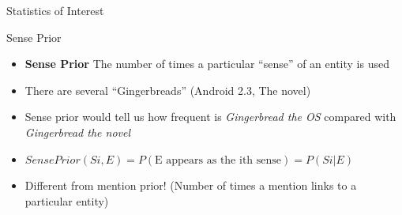 
\begin{frame}
 \begin{center}
  \Huge Statistics of Interest
 \end{center}

\end{frame}

\begin{frame}{Sense Prior}
\begin{itemize}

\item \textbf{Sense Prior} The number of times a particular ``sense'' of an entity is used \medskip
\item There are several ``Gingerbreads'' (Android 2.3, The novel) \medskip
\item Sense prior would tell us how frequent is \emph{Gingerbread the OS} compared with \emph{Gingerbread the novel}  \medskip
\item $Sense Prior(Si , E) = P (\text{E appears as the ith sense}) = P (Si |E) $ \medskip
\item Different from mention prior! (Number of times a mention links to a particular entity)
\end{itemize}
\end{frame}


